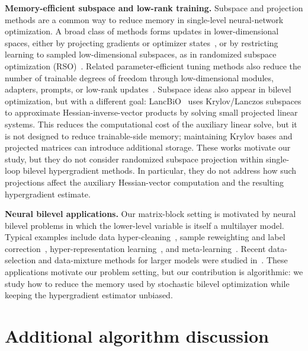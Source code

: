 \documentclass{pkumelon}
\theoremstyle{plain}
\begin{document}
\textbf{Memory-efficient subspace and low-rank training. }
Subspace and projection methods are a common way to reduce memory in single-level neural-network optimization. A broad class of methods forms updates in lower-dimensional spaces, either by projecting gradients or optimizer states~\citep{zhao2024galore,zhang2025breaking,he2024subspace,xiao2025coap,zhu2025apollo}, or by restricting learning to sampled low-dimensional subspaces, as in randomized subspace optimization (RSO)~\citep{chen2025memory}. Related parameter-efficient tuning methods also reduce the number of trainable degrees of freedom through low-dimensional modules, adapters, prompts, or low-rank updates~\citep{hu2022lora,lialin2023relora,liu2024dora,han2024sltrain,miles2024velora,houlsby2019parameter,liu2025cola,kong2025cr,mo2025parameter}. Subspace ideas also appear in bilevel optimization, but with a different goal: LancBiO~\citep{yang2024lancbio} uses Krylov/Lanczos subspaces to approximate Hessian-inverse-vector products by solving small projected linear systems. This reduces the computational cost of the auxiliary linear solve, but it is not designed to reduce trainable-side memory; maintaining Krylov bases and projected matrices can introduce additional storage. These works motivate our study, but they do not consider randomized subspace projection within single-loop bilevel hypergradient methods. In particular, they do not address how such projections affect the auxiliary Hessian-vector computation and the resulting hypergradient estimate.

\textbf{Neural bilevel applications. }
Our matrix-block setting is motivated by neural bilevel problems in which the lower-level variable is itself a multilayer model. Typical examples include data hyper-cleaning~\citep{shaban2019truncated}, sample reweighting and label correction~\citep{ren2018learning,zheng2021meta,tu2023learning,hao2024bilevel,yang2024tuning}, hyper-representation learning~\citep{franceschi2018bilevel,huang2024optimal,yang2025first}, and meta-learning~\citep{rajeswaran2019meta,bertinetto2018meta}. Recent data-selection and data-mixture methods for larger models were studied in~\citep{fan2023doge,xie2023doremi,shen2024seal,pan2025scalebio,wang2026draw}. These applications motivate our problem setting, but our contribution is algorithmic: we study how to reduce the memory used by stochastic bilevel optimization while keeping the hypergradient estimator unbiased.

\section{Additional algorithm discussion}
\label{app:additional_algorithm_discussion}
\end{document}
